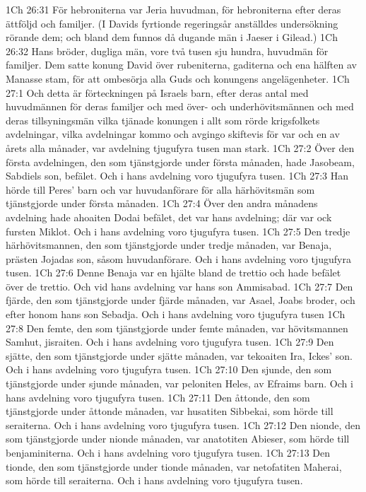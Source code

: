 1Ch 26:31  För hebroniterna var Jeria huvudman, för hebroniterna efter deras ättföljd och familjer. (I Davids fyrtionde regeringsår anställdes undersökning rörande dem; och bland dem funnos då dugande män i Jaeser i Gilead.)
1Ch 26:32  Hans bröder, dugliga män, vore två tusen sju hundra, huvudmän för familjer. Dem satte konung David över rubeniterna, gaditerna och ena hälften av Manasse stam, för att ombesörja alla Guds och konungens angelägenheter.
1Ch 27:1  Och detta är förteckningen på Israels barn, efter deras antal med huvudmännen för deras familjer och med över- och underhövitsmännen och med deras tillsyningsmän vilka tjänade konungen i allt som rörde krigsfolkets avdelningar, vilka avdelningar kommo och avgingo skiftevis för var och en av årets alla månader, var avdelning tjugufyra tusen man stark.
1Ch 27:2  Över den första avdelningen, den som tjänstgjorde under första månaden, hade Jasobeam, Sabdiels son, befälet. Och i hans avdelning voro tjugufyra tusen.
1Ch 27:3  Han hörde till Peres' barn och var huvudanförare för alla härhövitsmän som tjänstgjorde under första månaden.
1Ch 27:4  Över den andra månadens avdelning hade ahoaiten Dodai befälet, det var hans avdelning; där var ock fursten Miklot. Och i hans avdelning voro tjugufyra tusen.
1Ch 27:5  Den tredje härhövitsmannen, den som tjänstgjorde under tredje månaden, var Benaja, prästen Jojadas son, såsom huvudanförare. Och i hans avdelning voro tjugufyra tusen.
1Ch 27:6  Denne Benaja var en hjälte bland de trettio och hade befälet över de trettio. Och vid hans avdelning var hans son Ammisabad.
1Ch 27:7  Den fjärde, den som tjänstgjorde under fjärde månaden, var Asael, Joabs broder, och efter honom hans son Sebadja. Och i hans avdelning voro tjugufyra tusen
1Ch 27:8  Den femte, den som tjänstgjorde under femte månaden, var hövitsmannen Samhut, jisraiten. Och i hans avdelning voro tjugufyra tusen.
1Ch 27:9  Den sjätte, den som tjänstgjorde under sjätte månaden, var tekoaiten Ira, Ickes' son. Och i hans avdelning voro tjugufyra tusen.
1Ch 27:10  Den sjunde, den som tjänstgjorde under sjunde månaden, var peloniten Heles, av Efraims barn. Och i hans avdelning voro tjugufyra tusen.
1Ch 27:11  Den åttonde, den som tjänstgjorde under åttonde månaden, var husatiten Sibbekai, som hörde till seraiterna. Och i hans avdelning voro tjugufyra tusen.
1Ch 27:12  Den nionde, den som tjänstgjorde under nionde månaden, var anatotiten Abieser, som hörde till benjaminiterna. Och i hans avdelning voro tjugufyra tusen.
1Ch 27:13  Den tionde, den som tjänstgjorde under tionde månaden, var netofatiten Maherai, som hörde till seraiterna. Och i hans avdelning voro tjugufyra tusen.
